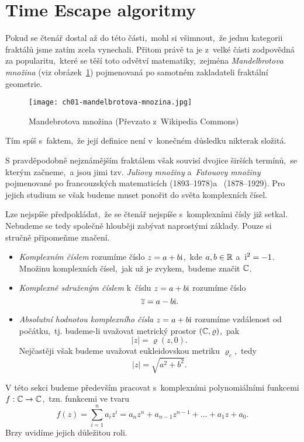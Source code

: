 \section{Time Escape algoritmy}\label{sec:tea}

Pokud se čtenář dostal až do této části,~mohl si všimnout,~že jednu kategorii fraktálů jsme zatím zcela vynechali. Přitom právě ta je z~velké části zodpovědná za popularitu,~které se těší toto odvětví matematiky,~zejména \emph{Mandelbrotova množina} (viz obrázek~\ref{fig:mandebrotova-mnozina}) pojmenovaná po samotném zakladateli fraktální geometrie.
\begin{figure}[h]
    \centering
    \texttt{[image: ch01-mandelbrotova-mnozina.jpg]}
    \caption[Mandebrotova množina]{Mandebrotova množina (Převzato z~Wikipedia Commons)\footnotemark}
    \label{fig:mandebrotova-mnozina}
\end{figure}
Tím spíš s~faktem,~že její definice není v~konečném důsledku nikterak složitá.

S pravděpodobně nejznámějším fraktálem však souvisí dvojice širších termínů,~se kterým začneme,~a jsou jimi tzv. \emph{Juliovy množiny} a~\emph{Fatouovy množiny} pojmenované po francouzských matematicích  (1893--1978)\linebreak a~ (1878--1929). Pro jejich studium se však budeme muset ponořit do světa komplexních čísel.

Lze nejspíše předpokládat,~že se čtenář nejspíše s~komplexními čísly již setkal. Nebudeme se tedy společně hlouběji zabývat naprostými základy. Pouze si stručně připomeňme značení.
\begin{itemize}
    \item \emph{Komplexním číslem} rozumíme číslo $z=a+b\textrm{i}$,~kde $a,b\in\mathbb{R}$ a~$\textrm{i}^2=-1$. Množinu komplexních čísel,~jak už je zvykem,~budeme značit $\mathbb{C}$.
    \item \emph{Komplexně sdruženým číslem} k~číslu $z=a+b\textrm{i}$ rozumíme číslo
    \[\overline{z}=a-b\textrm{i}.\]
    \item \emph{Absolutní hodnotou komplexního čísla} $z=a+b\textrm{i}$ rozumíme vzdálenost od počátku,~tj. budeme-li uvažovat metrický prostor $(\mathbb{C},\varrho)$,~pak
    \[|z|=\varrho(z,0).\]
    Nejčastěji však budeme uvažovat eukleidovskou metriku $\varrho_e$,~tedy
    \[|z|=\sqrt{a^2+b^2}.\]
\end{itemize}
V této sekci budeme především pracovat s~komplexními polynomiálními funkcemi $f:\mathbb{C} \rightarrow \mathbb{C}$,~tzn. funkcemi ve tvaru
\[f(z)=\sum_{i=1}^{n}a_iz^i=a_nz^n+a_{n-1}z^{n-1}+\dots+a_1z+a_0.\]
Brzy uvidíme jejich důležitou roli.

